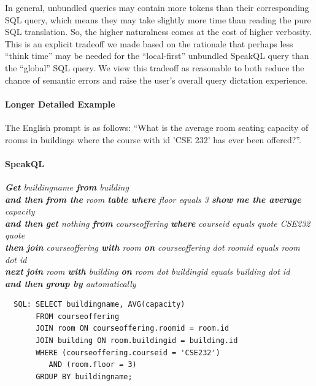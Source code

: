 In general, unbundled queries may contain more tokens than their corresponding SQL query, which means they may take slightly more time than reading the pure SQL translation. 
So, the higher naturalness comes at the cost of higher verbosity. 
This is an explicit tradeoff we made based on the rationale that perhaps less ``think time'' may be needed for the ``local-first'' unbundled SpeakQL query than the ``global'' SQL query.
We view this tradeoff as reasonable to both reduce the chance of semantic errors and raise the user's overall query dictation experience.



\paragraph{\textbf{Longer Detailed Example}}

The English prompt is as follows: ``What is the average room seating capacity of rooms in buildings where the course with id 'CSE 232' has ever been offered?''.

\paragraph{SpeakQL} 
\emph{
  \textbf{Get} buildingname \textbf{from} building \\
  \textbf{and then}
  \textbf{from the} room \textbf{table where} floor equals 3 \textbf{show me the average} capacity \\
  \textbf{and then}
  \textbf{get} nothing \textbf{from} courseoffering \textbf{where} courseid equals quote CSE232 quote \\
  \textbf{then}
  \textbf{join} courseoffering \textbf{with} room \textbf{on} courseoffering dot roomid equals room dot id \\
  \textbf{next}
  \textbf{join} room \textbf{with} building \textbf{on} room dot buildingid equals building dot id \\
  \textbf{and then}
  \textbf{group by} automatically
}

\begin{verbatim}
  SQL: SELECT buildingname, AVG(capacity)
       FROM courseoffering
       JOIN room ON courseoffering.roomid = room.id
       JOIN building ON room.buildingid = building.id
       WHERE (courseoffering.courseid = 'CSE232')
          AND (room.floor = 3)
       GROUP BY buildingname;
\end{verbatim}




